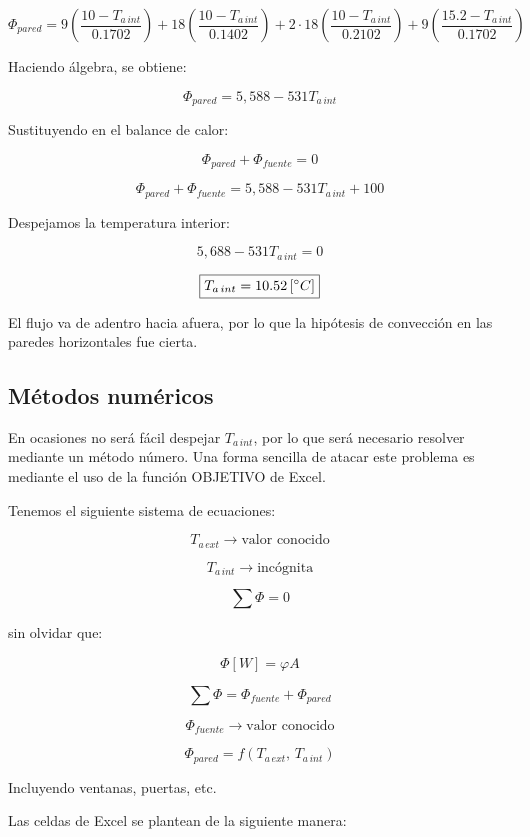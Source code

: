 \documentclass[11pt]{article}
\begin{document}
\[ \Phi _{ pared } = 9 \left( \frac{ 10 - T_{ a \, int } }{ 0.1702 } \right) + 18 \left( \frac{ 10 - T_{ a \, int } }{ 0.1402 } \right) + 2 \cdot 18 \left( \frac{ 10 - T_{ a \, int } }{ 0.2102 } \right) + 9 \left( \frac{ 15.2 - T_{ a \, int } }{ 0.1702 } \right) \]

Haciendo álgebra, se obtiene:

\[ \Phi _{ pared } = 5,588 - 531 T_{ a \, int } \]

Sustituyendo en el balance de calor:

\[ \Phi _{ pared } + \Phi _{ fuente } = 0 \]

\[ \Phi _{ pared } + \Phi _{ fuente } = 5,588 -531 T_{ a \, int } + 100 \]

Despejamos la temperatura interior: 

\[ 5,688 - 531 T_{ a \, int } = 0 \]

\[ \boxed{
    T_{ a \, int } = 10.52 \left[ \degree C \right]
} \]

El flujo va de adentro hacia afuera, por lo que la hipótesis de convección en las paredes horizontales fue cierta.

\subsection*{Métodos numéricos}

En ocasiones no será fácil despejar $ T_{ a \, int} $, por lo que será necesario resolver mediante un método número. Una forma sencilla de atacar este problema es mediante el uso de la función OBJETIVO de Excel.

Tenemos el siguiente sistema de ecuaciones:

\[ T_{ a \, ext } \longrightarrow \text{valor conocido} \]

\[ T_{ a \, int } \longrightarrow \text{incógnita} \]

\[ \sum{ \Phi } = 0 \]

sin olvidar que:

\[ \Phi \left[ W \right] = \varphi A \]

\[ \sum{ \Phi } = \Phi _{ fuente } + \Phi _{ pared } \]

\[ \Phi _{ fuente } \longrightarrow \text{valor conocido} \]

\[ \Phi _{ pared } = f \left( T_{ a \, ext }, \, T_{ a \, int } \right) \]

Incluyendo ventanas, puertas, etc.

Las celdas de Excel se plantean de la siguiente manera:
\end{document}
